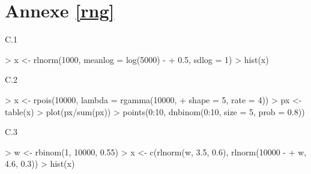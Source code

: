 \section*{Annexe \ref{rng}}
\begin{reponse}{C.1}
\begin{Schunk}
\begin{Sinput}
> x <- rlnorm(1000, meanlog = log(5000) -
+     0.5, sdlog = 1)
> hist(x)
\end{Sinput}
\end{Schunk}
  
\end{reponse}
\begin{reponse}{C.2}
\begin{Schunk}
\begin{Sinput}
> x <- rpois(10000, lambda = rgamma(10000,
+     shape = 5, rate = 4))
> px <- table(x)
> plot(px/sum(px))
> points(0:10, dnbinom(0:10, size = 5, prob = 0.8))
\end{Sinput}
\end{Schunk}
  
\end{reponse}
\begin{reponse}{C.3}
\begin{Schunk}
\begin{Sinput}
> w <- rbinom(1, 10000, 0.55)
> x <- c(rlnorm(w, 3.5, 0.6), rlnorm(10000 -
+     w, 4.6, 0.3))
> hist(x)
\end{Sinput}
\end{Schunk}
  
\end{reponse}
